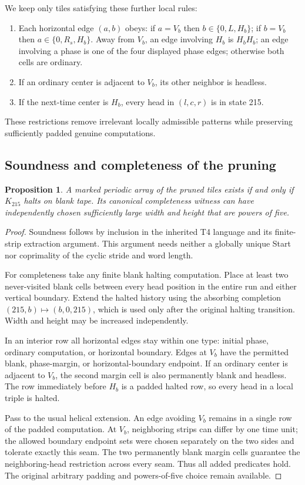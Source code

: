 \documentclass[11pt]{article}
\newtheorem{proposition}[theorem]{Proposition}
\theoremstyle{definition}\newtheorem{definition}[theorem]{Definition}
\theoremstyle{remark}\newtheorem{remark}[theorem]{Remark}
\begin{document}
We keep only tiles satisfying these further local rules:
\begin{enumerate}[nosep]
\item Each horizontal edge $(a,b)$ obeys: if $a=V_b$ then $b\in\{0,L,H_b\}$; if $b=V_b$ then $a\in\{0,R_s,H_b\}$. Away from $V_b$, an edge involving $H_b$ is $H_bH_b$; an edge involving a phase is one of the four displayed phase edges; otherwise both cells are ordinary.
\item If an ordinary center is adjacent to $V_b$, its other neighbor is headless.
\item If the next-time center is $H_b$, every head in $(l,c,r)$ is in state 215.
\end{enumerate}
These restrictions remove irrelevant locally admissible patterns while preserving sufficiently padded genuine computations.

\subsection{Soundness and completeness of the pruning}
\begin{proposition}
\label{prop:pruned}
A marked periodic array of the pruned tiles exists if and only if $K_{215}$ halts on blank tape. Its canonical completeness witness can have independently chosen sufficiently large width and height that are powers of five.
\end{proposition}
\begin{proof}
Soundness follows by inclusion in the inherited T4 language and its finite-strip extraction argument. This argument needs neither a globally unique Start nor coprimality of the cyclic stride and word length.

For completeness take any finite blank halting computation. Place at least two never-visited blank cells between every head position in the entire run and either vertical boundary. Extend the halted history using the absorbing completion $(215,b)\mapsto(b,0,215)$, which is used only after the original halting transition. Width and height may be increased independently.

In an interior row all horizontal edges stay within one type: initial phase, ordinary computation, or horizontal boundary. Edges at $V_b$ have the permitted blank, phase-margin, or horizontal-boundary endpoint. If an ordinary center is adjacent to $V_b$, the second margin cell is also permanently blank and headless. The row immediately before $H_b$ is a padded halted row, so every head in a local triple is halted.

Pass to the usual helical extension. An edge avoiding $V_b$ remains in a single row of the padded computation. At $V_b$, neighboring strips can differ by one time unit; the allowed boundary endpoint sets were chosen separately on the two sides and tolerate exactly this seam. The two permanently blank margin cells guarantee the neighboring-head restriction across every seam. Thus all added predicates hold. The original arbitrary padding and powers-of-five choice remain available.
\end{proof}
\end{document}
